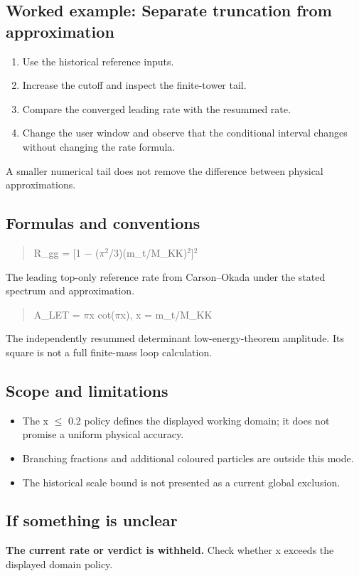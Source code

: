 \documentclass[11pt,a4paper]{article}
\begin{document}
\subsection*{Worked example: Separate truncation from approximation}
\begin{enumerate}
\item Use the historical reference inputs.
\item Increase the cutoff and inspect the finite-tower tail.
\item Compare the converged leading rate with the resummed rate.
\item Change the user window and observe that the conditional interval changes without changing the rate formula.
\end{enumerate}
A smaller numerical tail does not remove the difference between physical approximations.
\subsection*{Formulas and conventions}
\begin{quote}R\_gg = [1 \ensuremath{-} (\ensuremath{\pi}\ensuremath{{}^{2}}/3)(m\_t/M\_KK)\ensuremath{{}^{2}}]\ensuremath{{}^{2}}\end{quote}
The leading top-only reference rate from Carson--Okada under the stated spectrum and approximation.

\begin{quote}A\_LET = \ensuremath{\pi}x cot(\ensuremath{\pi}x),  x = m\_t/M\_KK\end{quote}
The independently resummed determinant low-energy-theorem amplitude. Its square is not a full finite-mass loop calculation.

\subsection*{Scope and limitations}
\begin{itemize}
\item The x \ensuremath{\leq} 0.2 policy defines the displayed working domain; it does not promise a uniform physical accuracy.
\item Branching fractions and additional coloured particles are outside this mode.
\item The historical scale bound is not presented as a current global exclusion.
\end{itemize}
\subsection*{If something is unclear}
\textbf{The current rate or verdict is withheld.} Check whether x exceeds the displayed domain policy.
\end{document}
